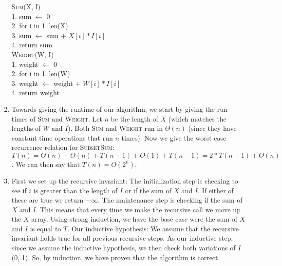 \documentclass{article}
\begin{document}
\begin{enumerate}
\begin{algorithm}
        \textsc{Sum}(X, I) \\
        1.  \hspace{0em} sum $\leftarrow$ 0 \\
        2.  \hspace{0em} for i in 1..len(X) \\
        3.  \hspace{2em}     sum $\leftarrow$ sum + $X[i]*I[i]$ \\
        4.  \hspace{0em} return sum \\

        \textsc{Weight}(W, I) \\
        1.  \hspace{0em} weight $\leftarrow$ 0 \\
        2.  \hspace{0em} for i in 1..len(W) \\
        3.  \hspace{2em}     weight $\leftarrow$ weight + $W[i]*I[i]$ \\
        4.  \hspace{0em} return weight
    \end{algorithm}
    \newpage
    \item Towards giving the runtime of our algorithm, we start by giving the run times of \textsc{Sum} and \textsc{Weight}.
    Let $n$ be the length of $X$ (which matches the lengths of $W$ and $I$).
    Both \textsc{Sum} and \textsc{Weight} run in $\Theta(n)$ (since they have constant time operations that run $n$ times).
    Now we give the worst case recurrence relation for \textsc{SubsetSum}: $T(n) = \Theta(n) + \Theta(n) + T(n-1) + O(1) + T(n-1) = 2*T(n-1) + \Theta(n)$.
    We can then say that $T(n) = O(2^n)$.
    \item First we set up the recursive invariant: The initialization step is checking to see if $i$ is greater than the length of $I$ or if the sum of $X$ and $I$. If either of these are true we return $-\infty$. The maintenance step is checking if the sum of $X$ and $I$. This means that every time we make the recursive call we move up the $X$ array.  Using strong induction, we have the base case were the sum of $X$ and $I$ is equal to $T$.  Our inductive hypothesis: We assume that the recursive invariant holds true for all previous recursive steps.  As our inductive step, since we assume the inductive hypothesis, we then check both variations of $I$ (0, 1). So, by induction, we have proven that the algorithm is correct.
\end{enumerate}
\end{document}
